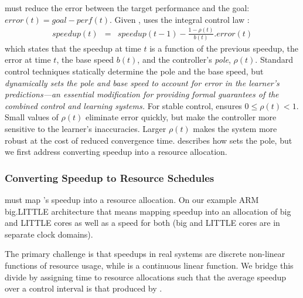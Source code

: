 \SYSTEM{} must reduce the error between the target performance and the goal: $ error(t) = goal - perf(t)$.
Given , \SYSTEM{} uses the integral control law
\cite{Hellerstein2004a}:
\begin{eqnarray}
  speedup(t) &=& speedup(t-1) - \frac{1 - \rho(t)}{b(t)}.error(t)
  \label{eqn:speedup-control}
\end{eqnarray}
which states that the speedup at time $t$ is a function of the
previous speedup, the error at time $t$, the base speed $b(t)$, and
the controller's \emph{pole}, $\rho(t)$.  Standard control techniques
statically determine the pole and the base speed, but \SYSTEM{}
\emph{dynamically sets the pole and base speed to account for error in
  the learner's predictions---an essential modification for providing
  formal guarantees of the combined control and learning systems.}
For stable control, \SYSTEM{} ensures $0 \le \rho(t) < 1$. Small
values of $\rho(t)$ eliminate error quickly, but make the controller
more sensitive to the learner's inaccuracies.  Larger $\rho(t)$ makes
the system more robust at the cost of reduced convergence time.
 describes how \SYSTEM{} sets the pole, but we
first address converting speedup into a resource allocation.

\subsubsection{Converting Speedup to Resource Schedules}
\SYSTEM{} must map 's speedup into a resource
allocation.  On our example ARM big.LITTLE architecture that means
mapping speedup into an allocation of big and LITTLE cores as well as
a speed for both (big and LITTLE cores are in separate clock domains).

The primary challenge is that speedups in real systems are discrete
non-linear functions of resource usage, while 
is a continuous linear function.  We bridge this divide by assigning
time to resource allocations such that the average speedup over a
control interval is that produced by .

